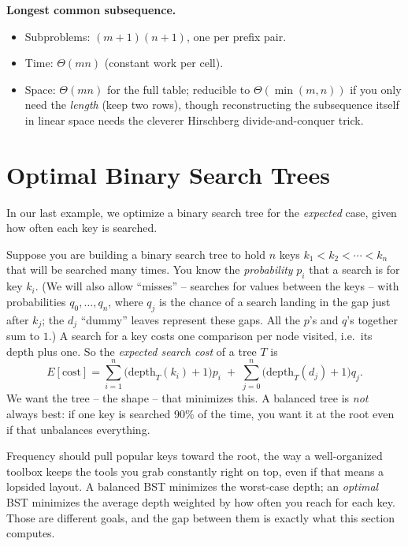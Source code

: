 \begin{complexitybox}
\textbf{Longest common subsequence.}
\begin{itemize}
  \item Subproblems: $(m+1)(n+1)$, one per prefix pair.
  \item Time: $\Theta(mn)$ (constant work per cell).
  \item Space: $\Theta(mn)$ for the full table; reducible to $\Theta(\min(m,n))$
  if you only need the \emph{length} (keep two rows), though reconstructing the
  subsequence itself in linear space needs the cleverer Hirschberg
  divide-and-conquer trick.
\end{itemize}
\end{complexitybox}

\section{Optimal Binary Search Trees}
\label{ch15:obst}

In our last example, we optimize a binary search tree for the
\emph{expected} case, given how often each key is searched.

Suppose you are building a binary search tree to hold $n$ keys
$k_1 < k_2 < \cdots < k_n$ that will be searched many times. You know the
\emph{probability} $p_i$ that a search is for key $k_i$. (We will also allow
``misses'' -- searches for values between the keys -- with probabilities
$q_0, \dots, q_n$, where $q_j$ is the chance of a search landing in the gap
just after $k_j$; the $d_j$ ``dummy'' leaves represent these gaps. All the
$p$'s and $q$'s together sum to $1$.) A search for a key costs one comparison
per node visited, i.e.\ its depth plus one. So the \emph{expected search cost}
of a tree $T$ is
\[
  E[\text{cost}] = \sum_{i=1}^{n}\bigl(\mathrm{depth}_T(k_i)+1\bigr)p_i
  \;+\; \sum_{j=0}^{n}\bigl(\mathrm{depth}_T(d_j)+1\bigr)q_j.
\]
We want the tree -- the shape -- that minimizes this. A balanced tree is
\emph{not} always best: if one key is searched 90\% of the time, you want it at
the root even if that unbalances everything.

\begin{intuitionbox}
Frequency should pull popular keys toward the root, the way a well-organized
toolbox keeps the tools you grab constantly right on top, even if that means a
lopsided layout. A balanced BST minimizes the worst-case depth; an
\emph{optimal} BST minimizes the average depth weighted by how often you
reach for each key. Those are different goals, and the gap between
them is exactly what this section computes.
\end{intuitionbox}

